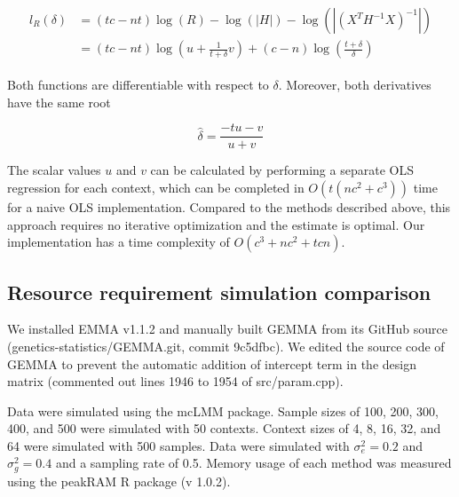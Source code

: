         \begin{align}
        \begin{split}
            l_R(\delta) & = (tc-nt)\log{(R)} - \log(|H|) - \log{(|(X^TH^{-1}X)^{-1}|)} \\
                        & = (tc-nt)\log{\left(u + \frac{1}{t+\delta} v\right)} + (c-n)\log{\left(\frac{t+\delta}{\delta}\right)}
        \end{split}
        \end{align}
        
        Both functions are differentiable with respect to $\delta$. Moreover, both derivatives have the same root
        
        \begin{equation}
            \hat{\delta} = \frac{-tu - v}{u+v}
        \end{equation}
    
        The scalar values $u$ and $v$ can be calculated by performing a separate OLS regression for each context, which can be completed in $O(t(nc^2 + c^3))$ time for a naive OLS implementation. Compared to the methods described above, this approach requires no iterative optimization and the estimate is optimal. Our implementation has a time complexity of $O(c^3 + nc^2 + tcn)$. 
        
    \subsection{Resource requirement simulation comparison}
        We installed EMMA v1.1.2 and manually built GEMMA from its GitHub source (genetics-statistics/GEMMA.git, commit 9c5dfbc). We edited the source code of GEMMA to prevent the automatic addition of intercept term in the design matrix (commented out lines 1946 to 1954 of src/param.cpp).
        
        Data were simulated using the mcLMM package. Sample sizes of 100, 200, 300, 400, and 500 were simulated with 50 contexts. Context sizes of 4, 8, 16, 32, and 64 were simulated with 500 samples. Data were simulated with $\sigma^2_e=0.2$ and $\sigma^2_g=0.4$ and a sampling rate of 0.5. Memory usage of each method was measured using the peakRAM R package (v 1.0.2). 
    

